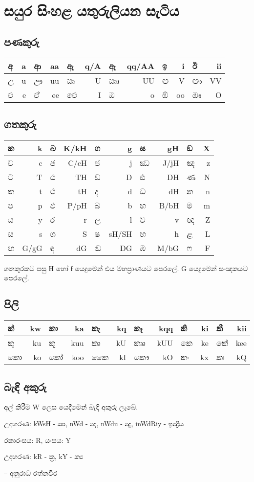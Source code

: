 \documentclass[a4paper,12pt]{article}
\begin{document}
\section*{සයුර සිංහළ යතුරුලියන සැටිය}
\subsection*{පණකුරු}

\begin{tabular}{|lr|lr|lr|lr|lr|lr|}
\hline
අ & a & ආ & aa & ඇ & q/A & ඈ & qq/AA & ඉ & i & ඊ & ii \\
\hline
උ & u & ඌ & uu & ඍ & U & ඎ & UU & ඏ & V & ඐ & VV \\
\hline
එ & e & ඒ & ee & ඓ & I & ඔ & o & ඕ & oo & ඖ & O \\
\hline
\end{tabular}

\subsection*{ගතකුරු}

\begin{tabular}{|lr|lr|lr|lr|lr|}
\hline
ක & k & ඛ & K/kH & ග & g & ඝ & gH & ඞ & X \\
\hline
ච & c & ඡ & C/cH & ජ & j & ඣ & J/jH & ඤ & z \\
\hline
ට & T & ඨ & TH & ඩ & D & ඪ & DH & ණ & N \\
\hline
ත & t & ථ & tH & ද & d & ධ & dH & න & n \\
\hline
ප & p & ඵ & P/pH & බ & b & භ & B/bH & ම & m \\
\hline
ය & y & ර & r & ල & l & ව & v &  ඥ & Z \\
\hline
ස & s & ශ & S & ෂ & sH/SH & හ & h & ළ & L \\
\hline
ඟ & G/gG & ඳ & dG & ඬ & DG & ඹ & M/bG & ෆ & F \\
\hline
\end{tabular}

ගතකුරකට පසු H හෝ f යෙදුමෙන් එය මහප්‍රාණයට පෙරලේ. G යෙදුමෙන් සංඤකයට පෙරලේ.

\subsection*{පිලි}

\begin{tabular}{|lr|lr|lr|lr|lr|lr|}
\hline
ක් & kw & කා & ka & කැ & kq & කෑ & kqq & කි & ki & කී & kii \\
\hline
කු & ku & කූ & kuu & කෘ & kU & කෲ & kUU & කෙ & ke & කේ & kee \\
\hline
කො & ko & කෝ & koo & කෛ & kI & කෞ & kO & කං & kx & කඃ & kQ \\
\hline
\end{tabular}

\subsection*{බැඳි අකුරු}

අල් කිරීම W ලෙස යෙදීමෙන් බැඳි අකුරු ලැබේ.

උදාහරණ: kWsH - ක්‍ෂ, nWd - න්‍ද, nWdu - න්‍දු, inWdRiy - ඉන්‍ද්‍රිය

රකාරංසය: R, යංසය: Y

උදාහරණ: kR - ක්‍ර, kY - ක්‍ය

\bigskip
\bigskip
\bigskip

-- අනුරාධ රත්නවීර
\end{document}
